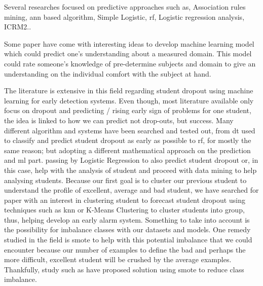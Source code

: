 \documentclass[../../main.tex]{subfiles}
\begin{document}
Several researches focused on predictive approaches such as, Association rules mining, \acrfull{ann} based algorithm, Simple Logistic, 
\acrfull{rf}, Logistic regression analysis, ICRM2.\cite{mduma_survey_2019}. 

Some paper have come with interesting ideas to develop machine learning model which could predict one's understanding about a measured domain. This model could rate someone's knowledge of pre-determine subjects and domain to give an understanding on the individual comfort with the subject at hand. \cite{lan_sparse_2014}

The literature is extensive in this field regarding student dropout using machine learning for early detection systems. Even though, most literature available only focus on dropout and predicting / rising early sign of problems for one student, the idea is linked to how we can predict not drop-outs, but success.
Many different algorithm and systems have been searched and tested out, from \acrfull{dt} used to classify and predict student dropout as early as possible \cite{behr_early_2020, heredia_student_2015, hofmann_rapidminer_2016, kemper_predicting_2020, lee_machine_2019, liang_big_2016, liang_machine_2016, quinlan_induction_1986,ramirez_prediction_2018,rokach_data_2015, song_decision_2015,tenpipat_student_2020,viloria_integration_2019,tin_kam_ho_random_1995}
to \acrfull{rf}, for mostly the same reason; but adopting a different mathematical approach on the prediction and \acrshort{ml} part. \cite{behr_early_2020,lee_machine_2019,liang_big_2016,liang_machine_2016,tenpipat_student_2020,tin_kam_ho_random_1995} passing by Logistic Regression to also predict student dropout or, in this case, help with the analysis of student and proceed with data mining to help analysing students.\cite{kemper_predicting_2020, kroc_graduation_1997, lan_sparse_2014, liang_big_2016, liang_machine_2016, novick_axioms_1966}
Because our first goal is to cluster our previous student to understand the profile of excellent, average and bad student, we have searched for paper with an interest in clustering student to forecast student dropout using techniques such as \acrfull{knn} or K-Means Clustering to cluster students into group, thus, helping develop an early alarm system. \cite{de_o_santos_supervised_2019, mardolkar_forecasting_2020,shiful_machine_2021}
Something to take into account is the possibility for imbalance classes with our datasets and models. One remedy studied in the field is \acrfull{smote} to help with this potential imbalance that we could encounter because our number of examples to define the bad and perhaps the more difficult, excellent student will be crushed by the average examples. Thankfully, study such as \cite{galar_review_2012, haixiang_learning_2017, lee_machine_2019} have proposed solution using \acrfull{smote} to reduce class imbalance.  
\end{document}

